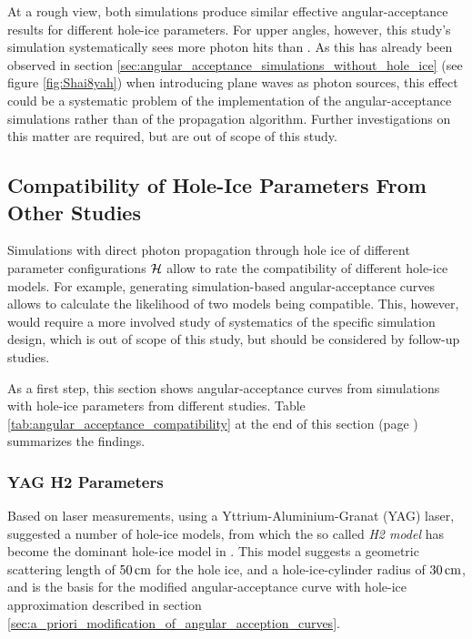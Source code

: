 At a rough view, both simulations produce similar effective
angular-acceptance results for different hole-ice parameters. For upper
angles, however, this study's simulation systematically sees more photon
hits than \ppc. As this has already been observed in section
\ref{sec:angular_acceptance_simulations_without_hole_ice} (see figure
\ref{fig:Shai8yah}) when introducing plane waves as photon sources, this
effect could be a systematic problem of the implementation of the
angular-acceptance simulations rather than of the propagation algorithm.
Further investigations on this matter are required, but are out of scope
of this study.\followup

\subsection{Compatibility of Hole-Ice Parameters From Other Studies}
\label{sec:angular_acceptance_comparison}

\label{sec:parameter_comparison}

\newcommand\ok{\ding{51}} %
\newcommand\same{\cellcolor{black!25}}
\newcommand\greyedout{\cellcolor{black!25}}
\newcommand\bad{\ding{55}}

\newcommand\clsimppc{\noun{clsim+ppc}}

Simulations with direct photon propagation through hole ice of different
parameter configurations \(\mathcal{H}\) allow to rate the compatibility of
different hole-ice models. For example, generating simulation-based
angular-acceptance curves allows to calculate the likelihood of two
models being compatible. This, however, would require a more involved
study of systematics of the specific simulation design, which is out of
scope of this study, but should be considered by follow-up
studies.\followup

As a first step, this section shows angular-acceptance curves from
simulations with hole-ice parameters from different studies. Table
\ref{tab:angular_acceptance_compatibility} at the end of this section
(page \pageref{tab:angular_acceptance_compatibility}) summarizes the
findings.

\subsubsection{YAG H2 Parameters}
\label{sec:yag_h2_parameters}

Based on laser measurements, using a Yttrium-Aluminium-Granat (YAG)
laser, \cite{holeicestudieswithyag} suggested a number of hole-ice
models, from which the so called \textit{H2 model} has become the
dominant hole-ice model in \icecube. This model suggests a geometric
scattering length of \(50\text{\,cm}\) for the hole ice, and a hole-ice-cylinder
radius of \(30\text{\,cm}\), and is the basis for the modified
angular-acceptance curve with hole-ice approximation described in
section \ref{sec:a_priori_modification_of_angular_acception_curves}.

